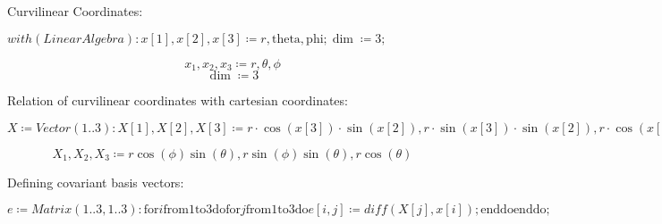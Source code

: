 \documentclass{article}
\begin{document}
\begin{Maple Normal}

\end{Maple Normal}
\begin{Maple Normal}
\textcolor[RGB]{0,128,0}{Curvilinear Coordinates:}
\end{Maple Normal}
\begin{Maple Normal}

\end{Maple Normal}
\begin{Maple Normal}
{$ \displaystyle \mathit{with} (\mathit{LinearAlgebra})\colon x [1],x [2],x [3]\coloneqq r ,\mathrm{theta},\mathrm{phi};\dim \coloneqq 3; $}
\end{Maple Normal}
\begin{dmath*}
x_{1},x_{2},x_{3}\coloneqq r ,\theta ,\phi 
\end{dmath*}
\vspace{-\bigskipamount}
\begin{dmath}\label{(1)}
\dim \coloneqq 3
\end{dmath}
\begin{Maple Normal}

\end{Maple Normal}
\begin{Maple Normal}
\textcolor[RGB]{0,128,0}{Relation of curvilinear coordinates with cartesian coordinates:}
\end{Maple Normal}
\begin{Maple Normal}

\end{Maple Normal}
\begin{Maple Normal}
{$ \displaystyle X \coloneqq \mathit{Vector} (1..3)\colon X [1],X [2],X [3]\coloneqq r \cdot \cos (x [3])\cdot \sin (x [2]),r \cdot \sin (x [3])\cdot \sin (x [2]),r \cdot \cos (x [2]); $}
\end{Maple Normal}
\begin{dmath}\label{(2)}
X_{1},X_{2},X_{3}\coloneqq r \cos \! \left(\phi \right) \sin \! \left(\theta \right),r \sin \! \left(\phi \right) \sin \! \left(\theta \right),r \cos \! \left(\theta \right)
\end{dmath}
\begin{Maple Normal}
Defining covariant basis vectors:
\end{Maple Normal}
\begin{Maple Normal}
{$ \displaystyle e \coloneqq \mathit{Matrix} (1..3,1..3)\colon \boldsymbol{\mathrm{for}}i \boldsymbol{\mathrm{from}}1\boldsymbol{\mathrm{to}}3\boldsymbol{\mathrm{do}}\boldsymbol{\mathrm{for}}j \boldsymbol{\mathrm{from}}1\boldsymbol{\mathrm{to}}3\boldsymbol{\mathrm{do}}e [i ,j]\coloneqq \mathit{diff} (X [j],x [i]);\boldsymbol{\mathrm{end}}\boldsymbol{\mathrm{do}}\boldsymbol{\mathrm{end}}\boldsymbol{\mathrm{do}}; $}
\end{Maple Normal}
\end{document}
